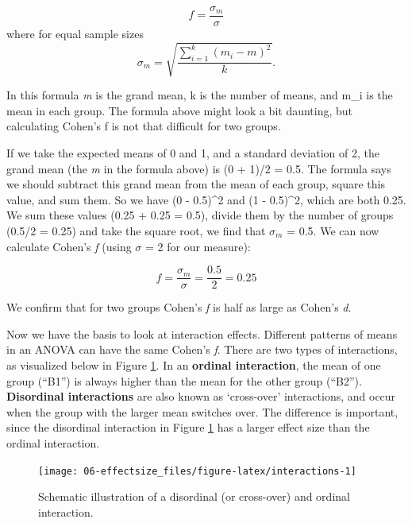 \documentclass[
  oneside]{krantz}
\begin{document}
\begin{equation}
f = \frac{\sigma _{ m }}{\sigma}
\end{equation}
where for equal sample sizes
\begin{equation}
\sigma _{ m } = \sqrt { \frac { \sum_ { i = 1 } ^ { k } ( m _ { i } - m ) ^ { 2 } } { k } }.
\end{equation}

In this formula \emph{m} is the grand mean, k is the number of means, and m\_i is the mean in each group. The formula above might look a bit daunting, but calculating Cohen's f is not that difficult for two groups.

If we take the expected means of 0 and 1, and a standard deviation of 2, the grand mean (the \emph{m} in the formula above) is (0 + 1)/2 = 0.5. The formula says we should subtract this grand mean from the mean of each group, square this value, and sum them. So we have (0 - 0.5)\^{}2 and (1 - 0.5)\^{}2, which are both 0.25. We sum these values (0.25 + 0.25 = 0.5), divide them by the number of groups (0.5/2 = 0.25) and take the square root, we find that \(\sigma_{ m }\) = 0.5. We can now calculate Cohen's \emph{f} (using \(\sigma\) = 2 for our measure):

\begin{equation}
f = \frac{\sigma _{ m }}{\sigma} = \frac{0.5}{2} = 0.25
\end{equation}

We confirm that for two groups Cohen's \emph{f} is half as large as Cohen's \emph{d}.

Now we have the basis to look at interaction effects. Different patterns of means in an ANOVA can have the same Cohen's \emph{f}. There are two types of interactions, as visualized below in Figure \ref{fig:interactions}. In an \textbf{ordinal interaction}, the mean of one group (``B1'') is always higher than the mean for the other group (``B2''). \textbf{Disordinal interactions} are also known as `cross-over' interactions, and occur when the group with the larger mean switches over. The difference is important, since the disordinal interaction in Figure \ref{fig:interactions} has a larger effect size than the ordinal interaction.



\begin{figure}

{\centering \texttt{[image: 06-effectsize\_files/figure-latex/interactions-1]} 

}

\caption{Schematic illustration of a disordinal (or cross-over) and ordinal interaction.}\label{fig:interactions}
\end{figure}
\end{document}

